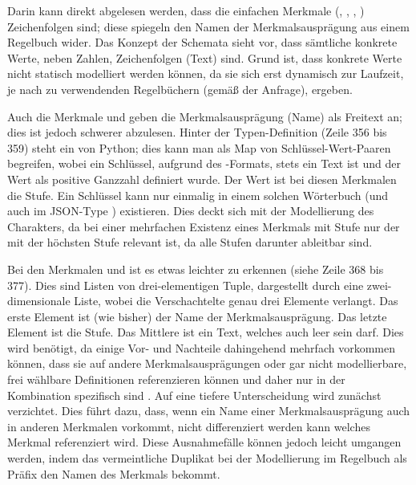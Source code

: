 Darin kann direkt abgelesen werden, dass die einfachen Merkmale (, , , ) Zeichenfolgen sind;
diese spiegeln den Namen der Merkmalsausprägung aus einem Regelbuch wider.
Das Konzept der Schemata sieht vor, dass sämtliche konkrete Werte, neben Zahlen, Zeichenfolgen (Text) sind.
Grund ist, dass konkrete Werte nicht statisch modelliert werden können, da sie sich erst dynamisch zur Laufzeit, je nach zu verwendenden Regelbüchern (gemäß der Anfrage), ergeben.

Auch die Merkmale  und  geben die Merkmalsausprägung (Name) als Freitext an;
dies ist jedoch schwerer abzulesen.
Hinter der Typen-Definition (\zB Zeile 356 bis 359) steht ein \sog {} von Python;
dies kann man als Map von Schlüssel-Wert-Paaren begreifen, wobei ein Schlüssel, aufgrund des -Formats, stets ein Text ist und der Wert als positive Ganzzahl definiert wurde.
Der Wert ist bei diesen Merkmalen die Stufe.
Ein Schlüssel kann nur einmalig in einem solchen Wörterbuch (und auch im JSON-Type ) existieren.
Dies deckt sich mit der Modellierung des Charakters, da bei einer mehrfachen Existenz eines Merkmals mit Stufe nur der mit der höchsten Stufe relevant ist, da alle Stufen darunter ableitbar sind.

Bei den Merkmalen  und  ist es etwas leichter zu erkennen (siehe Zeile 368 bis 377).
Dies sind Listen von drei-elementigen Tuple, dargestellt durch eine zwei-dimensionale Liste, wobei die Verschachtelte genau drei Elemente verlangt.
Das erste Element ist (wie bisher) der Name der Merkmalsausprägung.
Das letzte Element ist die Stufe.
Das Mittlere ist ein Text, welches \insb auch leer sein darf.
Dies wird benötigt, da einige Vor- und Nachteile dahingehend mehrfach vorkommen können, dass sie auf andere Merkmalsausprägungen oder gar nicht modellierbare, frei wählbare Definitionen referenzieren können und daher nur in der Kombination spezifisch sind .
Auf eine tiefere Unterscheidung wird zunächst verzichtet.
Dies führt dazu, dass, wenn ein Name einer Merkmalsausprägung auch in anderen Merkmalen vorkommt, nicht differenziert werden kann welches Merkmal referenziert wird.
Diese Ausnahmefälle können jedoch leicht umgangen werden, indem das vermeintliche Duplikat bei der Modellierung im Regelbuch \zB als Präfix den Namen des Merkmals bekommt.

